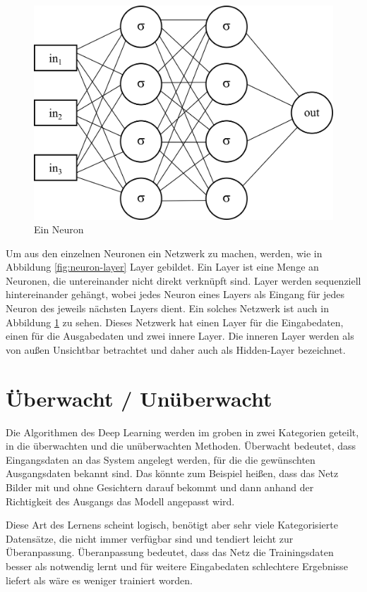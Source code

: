 \begin{figure}
\centering
\includegraphics[scale=1]{images/neuron-network.png}
\caption{Ein Neuron}
\label{fig:neuron-network}
\end{figure}

Um aus den einzelnen Neuronen ein Netzwerk zu machen, werden, wie in Abbildung \ref{fig:neuron-layer} Layer gebildet. Ein Layer ist eine Menge an Neuronen, die untereinander nicht direkt verknüpft sind. Layer werden sequenziell hintereinander gehängt, wobei jedes Neuron eines Layers als Eingang für jedes Neuron des jeweils nächsten Layers dient. Ein solches Netzwerk ist auch in Abbildung \ref{fig:neuron-network} zu sehen. Dieses Netzwerk hat einen Layer für die Eingabedaten, einen für die Ausgabedaten und zwei innere Layer. Die inneren Layer werden als von außen Unsichtbar betrachtet und daher auch als Hidden-Layer bezeichnet.

\section{Überwacht / Unüberwacht}

Die Algorithmen des Deep Learning werden im groben in zwei Kategorien geteilt, in die überwachten und die unüberwachten Methoden. Überwacht bedeutet, dass Eingangsdaten an das System angelegt werden, für die die gewünschten Ausgangsdaten bekannt sind. Das könnte zum Beispiel heißen, dass das Netz Bilder mit und ohne Gesichtern darauf bekommt und dann anhand der Richtigkeit des Ausgangs das Modell angepasst wird.

Diese Art des Lernens scheint logisch, benötigt aber sehr viele Kategorisierte Datensätze, die nicht immer verfügbar sind und tendiert leicht zur Überanpassung. Überanpassung bedeutet, dass das Netz die Trainingsdaten besser als notwendig lernt und für weitere Eingabedaten schlechtere Ergebnisse liefert als wäre es weniger trainiert worden.

